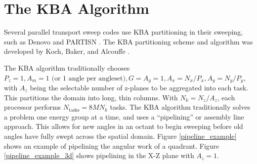 \section{The KBA Algorithm}\label{sec:KBA}

Several parallel transport sweep codes use KBA partitioning in their sweeping, such as Denovo \cite{denovo} and PARTISN \cite{partisn}. The KBA partitioning scheme and algorithm was developed by Koch, Baker, and Alcouffe \cite{KBA}.

The KBA algorithm traditionally chooses $P_z = 1, A_m = 1 \text{ (or 1 angle per angleset)}, G = A_g = 1, A_x = N_x/P_x, A_y = N_y/P_y$, with $A_z$ being the selectable number of z-planes to be aggregated into each task. This partitions the domain into long, thin columns. With $N_k = N_z/A_z$, each processor performs $N_{\text{tasks}} = 8MN_k$ tasks. The KBA algorithm traditionally solves a problem one energy group at a time, and uses a ``pipelining'' or assembly line approach. This allows for new angles in an octant to begin sweeping before old angles have fully swept across the spatial domain. Figure \ref{pipeline_example} shows an example of pipelining the angular work of a quadrant.
Figure \ref{pipeline_example_3d} shows pipelining in the X-Z plane with $A_z = 1$. 

